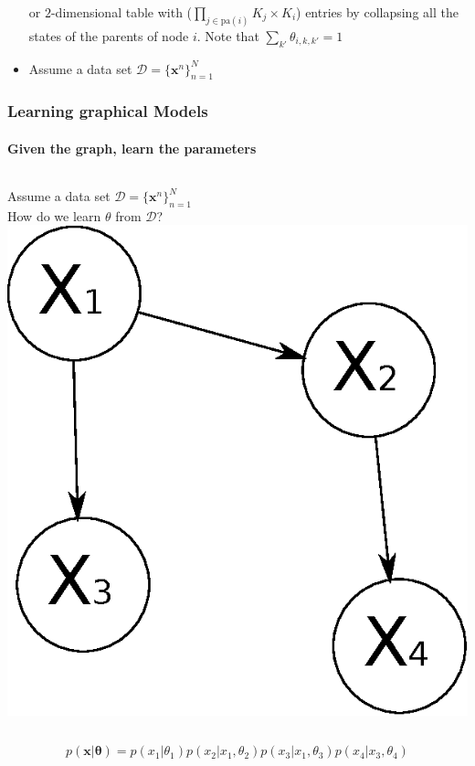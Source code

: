 \documentclass[slidestop,compress,mathserif]{beamer}
\begin{document}
\begin{frame}
\begin{itemize}[<+->]
	or $2$-dimensional table with ($\prod_{j\in\text{pa}(i)}K_j\times K_i$) entries by collapsing
 all the states of the parents of node $i$. Note that $\sum_{k'}\theta_{i,k,k'} = 1$
		
	\item Assume a data set $\mathcal{D} = \{ \mathbf{x}^n \}_{n=1}^{N}\qquad$
    	
	\end{itemize}
	
\end{frame}


\begin{frame}
	\frametitle{Learning graphical Models}
    \framesubtitle{Given the graph, learn the parameters}
	\vspace{-.3cm}
	\begin{columns}[T]
	 Assume a data set $\mathcal{D} = \{ \boldsymbol{x}^n \}_{n=1}^{N}\qquad$ \\
	 \vspace{.1cm}
	 How do we learn $\theta$ from $\mathcal{D}$?
	 \includegraphics[width=\textwidth]{g2}
	\end{columns}
	$$p(\boldsymbol{x}|\boldsymbol{\theta})=p(x_1|\theta_1)p(x_2|x_1,\theta_2)p(x_3|x_1,\theta_3)p(x_4|x_3,\theta_4)$$

\end{frame}
\end{document}
